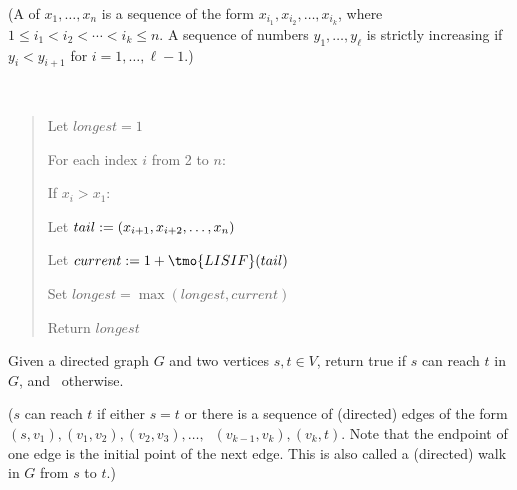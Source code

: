 \documentclass[10pt]{article}
\newcommand{\parof}[1]{\mleft( #1 \mright)}
\begin{document}
(A  of $x_1, \ldots, x_n$ is a sequence of the form $x_{i_1}, x_{i_2}, \ldots, x_{i_k}$, where $ 1\leq i_1<i_2<\cdots<i_k\leq n $. A sequence of numbers $y_1, \ldots, y_\ell$ is strictly increasing if $ y_i < y_{i+1} $ for $ i = 1, \ldots, \ell-1 $.)

\begin{solution}\ %
\begin{quote}%
\noindent{} %

%

\begin{steps}
  \item Let $longest = 1$
  \item For each index $i$ from 2 to $n$:
    \begin{steps}
    \item If $x_i > x_1$:
      \begin{steps}
      \item Let $tail := \parof{x_{i+1}, x_{i+2}, \ldots, x_n}$
      \item Let $current := 1 + \tmo{LISIF}(tail)$
      \item Set $longest = \max(longest, current)$
      \end{steps}
    \end{steps}
    \item Return $longest$
  \end{steps}
\end{quote}%
\end{solution}%
\pagebreak

Given a directed graph $G$ and two vertices $s, t \in V$, return true if $s$ can reach $t$ in $G$, and \boolF~otherwise.

($s$ can reach $t$ if either $s = t$ or there is a sequence of (directed) edges of the
form $(s, v_1), (v_1, v_2), (v_2, v_3), \ldots,$ $\ (v_{k-1}, v_k), (v_k, t)$. Note that the endpoint of one
edge is the initial point of the next edge. This is also called a (directed) walk in $G$ from $s$ to $t$.)
\end{document}
